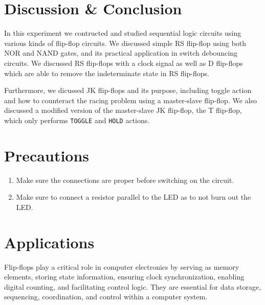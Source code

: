 \section{Discussion \& Conclusion}
In this experiment we contructed and studied sequential logic circuits using various kinds of flip-flop circuits. We discussed simple RS flip-flop using both NOR and NAND gates, and its practical application in switch debouncing circuits. We discussed RS flip-flops with a clock signal as well as D flip-flops which are able to remove the indeterminate state in RS flip-flops.

Furthermore, we dicussed JK flip-flops and its purpose, including toggle action and how to counteract the racing problem using a master-slave flip-flop. We also discussed a modified version of the master-slave JK flip-flop, the T flip-flop, which only performs \verb|TOGGLE| and \verb|HOLD| actions.

\section{Precautions}

\begin{enumerate}
    \item Make sure the connections are proper before switching on the circuit.
    \item Make sure to connect a resistor parallel to the LED as to not burn out the LED.
\end{enumerate}

\section{Applications}
Flip-flops play a critical role in computer electronics by serving as memory elements, storing state information, ensuring clock synchronization, enabling digital counting, and facilitating control logic. They are essential for data storage, sequencing, coordination, and control within a computer system.
